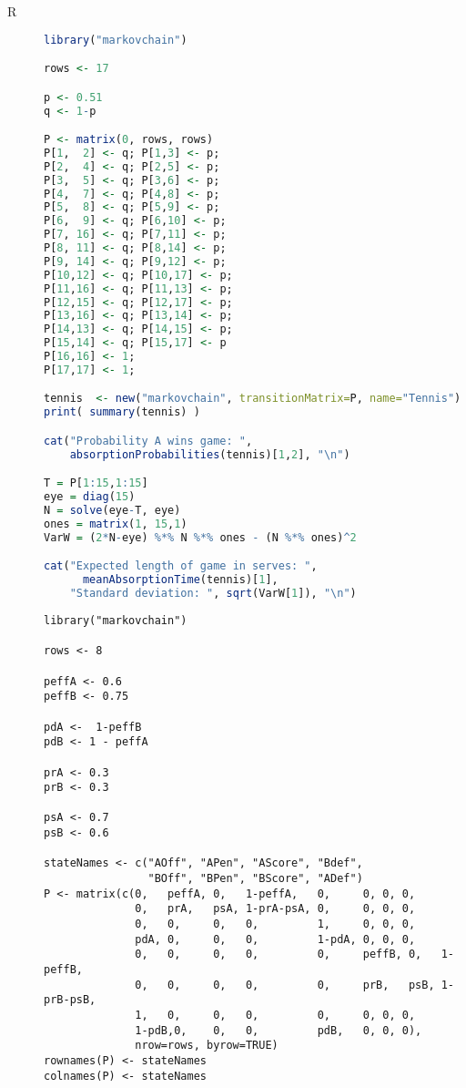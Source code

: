 
\begin{description}



\item[R] 


\begin{lstlisting}[language=R]
library("markovchain")

rows <- 17

p <- 0.51
q <- 1-p

P <- matrix(0, rows, rows)
P[1,  2] <- q; P[1,3] <- p;
P[2,  4] <- q; P[2,5] <- p;
P[3,  5] <- q; P[3,6] <- p;
P[4,  7] <- q; P[4,8] <- p;
P[5,  8] <- q; P[5,9] <- p;
P[6,  9] <- q; P[6,10] <- p;
P[7, 16] <- q; P[7,11] <- p;
P[8, 11] <- q; P[8,14] <- p;
P[9, 14] <- q; P[9,12] <- p;
P[10,12] <- q; P[10,17] <- p;
P[11,16] <- q; P[11,13] <- p;
P[12,15] <- q; P[12,17] <- p;
P[13,16] <- q; P[13,14] <- p;
P[14,13] <- q; P[14,15] <- p;
P[15,14] <- q; P[15,17] <- p
P[16,16] <- 1;
P[17,17] <- 1;

tennis  <- new("markovchain", transitionMatrix=P, name="Tennis")
print( summary(tennis) )

cat("Probability A wins game: ",
    absorptionProbabilities(tennis)[1,2], "\n")

T = P[1:15,1:15]
eye = diag(15)
N = solve(eye-T, eye)
ones = matrix(1, 15,1)
VarW = (2*N-eye) %*% N %*% ones - (N %*% ones)^2

cat("Expected length of game in serves: ",
      meanAbsorptionTime(tennis)[1],
    "Standard deviation: ", sqrt(VarW[1]), "\n")
\end{lstlisting}  


\begin{lstlisting}
library("markovchain")

rows <- 8

peffA <- 0.6
peffB <- 0.75

pdA <-  1-peffB
pdB <- 1 - peffA

prA <- 0.3
prB <- 0.3

psA <- 0.7
psB <- 0.6

stateNames <- c("AOff", "APen", "AScore", "Bdef",
                "BOff", "BPen", "BScore", "ADef")
P <- matrix(c(0,   peffA, 0,   1-peffA,   0,     0, 0, 0,
              0,   prA,   psA, 1-prA-psA, 0,     0, 0, 0,
              0,   0,     0,   0,         1,     0, 0, 0,
              pdA, 0,     0,   0,         1-pdA, 0, 0, 0,
              0,   0,     0,   0,         0,     peffB, 0,   1-peffB,
              0,   0,     0,   0,         0,     prB,   psB, 1-prB-psB,
              1,   0,     0,   0,         0,     0, 0, 0,
              1-pdB,0,    0,   0,         pdB,   0, 0, 0),
              nrow=rows, byrow=TRUE)
rownames(P) <- stateNames
colnames(P) <- stateNames


\end{lstlisting}
\end{description}
